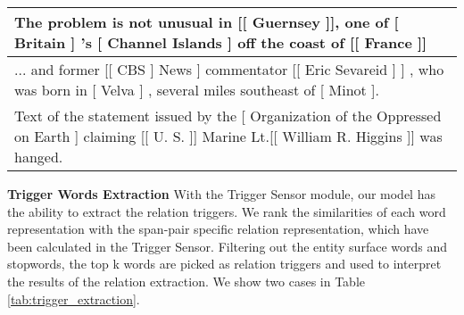 \documentclass[sigconf]{acmart}
\begin{document}
\begin{table*}
\small
  \begin{tabular}{@{}m{17.7cm}@{}}
  \toprule
  
    The problem is not unusual in {\color{red}[}{\color{blue}[} Guernsey {\color{blue}]}{\color{red}]}, one of {\color{blue}[} Britain {\color{blue}]} 's {\color{blue}[} Channel Islands {\color{blue}]} off the coast of {\color{red}[}{\color{blue}[} France {\color{blue}]}{\color{red}]} \\
\midrule

... and former  {\color{red}[}{\color{blue}[} CBS {\color{red}]} News {\color{blue}]} commentator  {\color{red}[}{\color{blue}[} Eric Sevareid {\color{blue}]} {\color{red}]}  , who was born in {\color{blue}[} Velva {\color{blue}]}  , several miles southeast of {\color{blue}[} Minot {\color{blue}]}. \\\midrule

  Text of the statement issued by the {\color{blue}[} Organization of the Oppressed on Earth {\color{blue}]} claiming {\color{red}[}{\color{blue}[} U. S.  {\color{blue}]}{\color{red}]} Marine Lt.{\color{red}[}{\color{blue}[} William R. Higgins {\color{blue}]}{\color{red}]} was hanged.\\ 

   \bottomrule
 \end{tabular}
 \caption{Typical error examples. Red brackets indicate entities predicted by the model, blue brackets indicate true entities, and the labels in the lower right corner indicate the type of relation  between the corresponding entities and the head or tail type (T for the tail entity; H for the head entity)}
   \label{tab:error}
\end{table*}




\noindent\textbf{Trigger Words Extraction}
With the Trigger Sensor module, our model has the ability to extract the relation triggers. We rank the similarities of each word representation with the span-pair specific relation representation, which have been calculated in the Trigger Sensor. Filtering out the entity surface words and stopwords, the top k words are picked as relation triggers and used to interpret the results of the relation extraction. We show two cases in Table \ref{tab:trigger_extraction}. 
\end{document}
